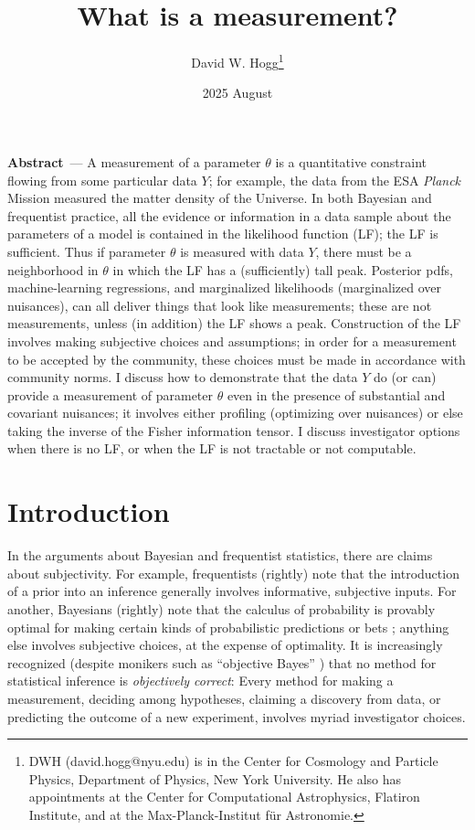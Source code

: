 \documentclass{article}
\title{\bfseries
What is a measurement?}
\author{David W. Hogg\footnote{%
DWH (david.hogg@nyu.edu) is in the Center for Cosmology and Particle Physics, Department of Physics, New York University.
He also has appointments at the Center for Computational Astrophysics, Flatiron Institute, and at the Max-Planck-Institut f\"ur Astronomie.}}
\date{2025 August}
\renewcommand{\paragraph}[1]{\bigskip\par\noindent\textbf{#1}~---}
\begin{document}
\maketitle\thispagestyle{empty}

\paragraph{Abstract}
A measurement of a parameter $\theta$ is a quantitative constraint flowing from some particular data $Y$; for example, the data from the ESA \textsl{Planck} Mission measured the matter density of the Universe.
In both Bayesian and frequentist practice, all the evidence or information in a data sample about the parameters of a model is contained in the likelihood function (LF); the LF is sufficient.
Thus if parameter $\theta$ is measured with data $Y$, there must be a neighborhood in $\theta$ in which the LF has a (sufficiently) tall peak.
Posterior pdfs, machine-learning regressions, and marginalized likelihoods (marginalized over nuisances), can all deliver things that look like measurements; these are not measurements, unless (in addition) the LF shows a peak.
Construction of the LF involves making subjective choices and assumptions; in order for a measurement to be accepted by the community, these choices must be made in accordance with community norms.
I discuss how to demonstrate that the data $Y$ do (or can) provide a measurement of parameter $\theta$ even in the presence of substantial and covariant nuisances; it involves either profiling (optimizing over nuisances) or else taking the inverse of the Fisher information tensor.
I discuss investigator options when there is no LF, or when the LF is not tractable or not computable.

\section{Introduction}\label{sec:intro}
In the arguments about Bayesian and frequentist statistics, there are claims about subjectivity.
For example, frequentists (rightly) note that the introduction of a prior into an inference generally involves informative, subjective inputs.
For another, Bayesians (rightly) note that the calculus of probability is provably optimal for making certain kinds of probabilistic predictions or bets \cite{jaynes}; anything else involves subjective choices, at the expense of optimality.
It is increasingly recognized (despite monikers such as ``objective Bayes'' \cite{objective}) that no method for statistical inference is \emph{objectively correct}:
Every method for making a measurement, deciding among hypotheses, claiming a discovery from data, or predicting the outcome of a new experiment, involves myriad investigator choices.
\end{document}
